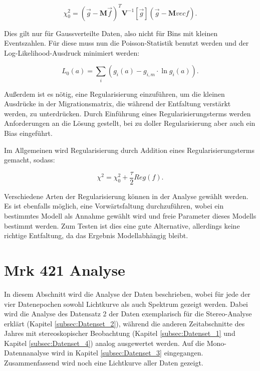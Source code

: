 \begin{equation}
 \chi_0^2=(\vec{g}-\mathbf{M}\vec{f})^T \mathbf{V}^{-1}[\vec{g}](\vec{g}-\mathbf{M}vec{f}).
\end{equation}

Dies gilt nur für Gaussverteilte Daten, also nicht für Bins mit kleinen Eventszahlen.
Für diese muss nun die Poisson-Statistik benutzt werden und der Log-Likelihood-Ausdruck minimiert werden:

\begin{equation}
 L_0(a)=\sum_i (g_i(a)-g_{i,m}\cdot \ln g_i(a)).
\end{equation}

Außerdem ist es nötig, eine Regularisierung einzuführen, um die kleinen Ausdrücke in der Migrationsmatrix, die während der Entfaltung verstärkt werden, zu unterdrücken.
Durch Einführung eines Regularisierungsterms werden Anforderungen an die Lösung gestellt, bei zu doller Regularisierung aber auch ein Bias eingeführt.

Im Allgemeinen wird Regularisierung durch Addition eines Regularisierungsterms gemacht, sodass:

\begin{equation}
 \chi^2=\chi_0^2 +\frac{\tau}{2} Reg(f).
\end{equation}

Verschiedene Arten der Regularisierung können in der Analyse gewählt werden.
Es ist ebenfalls möglich, eine Vorwärtsfaltung durchzuführen, wobei ein bestimmtes Modell als Annahme gewählt wird und freie Parameter dieses Modells bestimmt werden.
Zum Testen ist dies eine gute Alternative, allerdings keine richtige Entfaltung, da das Ergebnis Modellabhängig bleibt.

\section{Mrk 421 Analyse}
In diesem Abschnitt wird die Analyse der Daten beschrieben, wobei für jede der vier Datenepochen sowohl Lichtkurve als auch Spektrum gezeigt werden.
Dabei wird die Analyse des Datensatz 2 der Daten exemplarisch für die Stereo-Analyse erklärt (Kapitel \ref{subsec:Datenset_2}), während die anderen Zeitabschnitte des Jahres mit stereoskopischer Beobachtung (Kapitel \ref{subsec:Datenset_1} und Kapitel \ref{subsec:Datenset_4}) analog ausgewertet werden.
Auf die Mono-Datennanalyse wird in Kapitel \ref{subsec:Datenset_3} eingegangen.
Zusammenfassend wird noch eine Lichtkurve aller Daten gezeigt.


